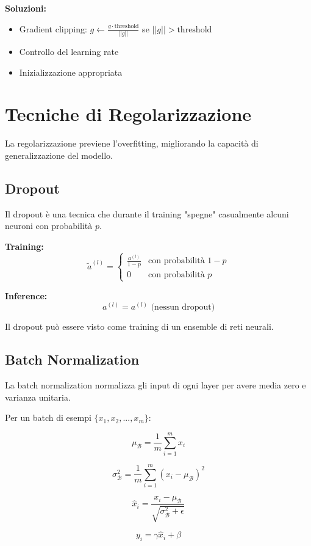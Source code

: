 \documentclass[12pt,a4paper,twoside]{report}
\begin{document}
\textbf{Soluzioni:}
\begin{itemize}
    \item Gradient clipping: $g \leftarrow \frac{g \cdot \text{threshold}}{||g||}$ se $||g|| > \text{threshold}$
    \item Controllo del learning rate
    \item Inizializzazione appropriata
\end{itemize}

\section{Tecniche di Regolarizzazione}

La regolarizzazione previene l'overfitting, migliorando la capacità di generalizzazione del modello.

\subsection{Dropout}

Il dropout è una tecnica che durante il training "spegne" casualmente alcuni neuroni con probabilità $p$.

\textbf{Training:}
$$\tilde{a}^{(l)} = \begin{cases} 
\frac{a^{(l)}}{1-p} & \text{con probabilità } 1-p \\
0 & \text{con probabilità } p
\end{cases}$$

\textbf{Inference:}
$$a^{(l)} = a^{(l)} \text{ (nessun dropout)}$$

Il dropout può essere visto come training di un ensemble di reti neurali.

\subsection{Batch Normalization}

La batch normalization normalizza gli input di ogni layer per avere media zero e varianza unitaria.

Per un batch di esempi $\{x_1, x_2, ..., x_m\}$:

$$\mu_{\mathcal{B}} = \frac{1}{m} \sum_{i=1}^{m} x_i$$

$$\sigma_{\mathcal{B}}^2 = \frac{1}{m} \sum_{i=1}^{m} (x_i - \mu_{\mathcal{B}})^2$$

$$\hat{x}_i = \frac{x_i - \mu_{\mathcal{B}}}{\sqrt{\sigma_{\mathcal{B}}^2 + \epsilon}}$$

$$y_i = \gamma \hat{x}_i + \beta$$
\end{document}
